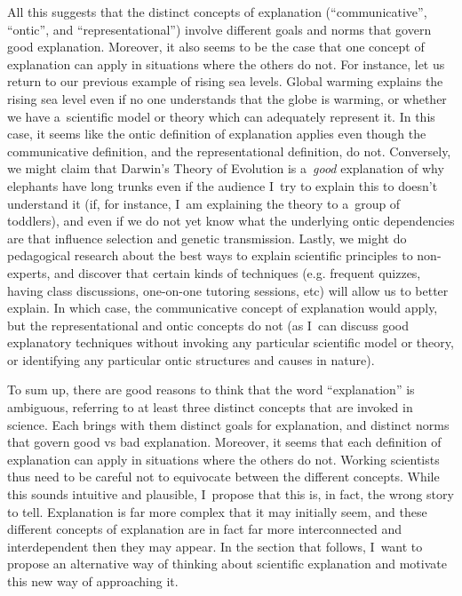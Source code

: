 All this suggests that the distinct concepts of explanation (``communicative'', ``ontic'', and ``representational'') involve different goals and norms that govern good explanation. Moreover, it also seems to be the case that one concept of explanation can apply in situations where the others do not. For instance, let us return to our previous example of rising sea levels. Global warming explains the rising sea level even if no one understands that the globe is warming, or whether we have a~scientific model or theory which can adequately represent it. In this case, it seems like the ontic definition of explanation applies even though the communicative definition, and the representational definition, do not. Conversely, we might claim that Darwin's Theory of Evolution is a~\textit{good} explanation of why elephants have long trunks even if the audience I~try to explain this to doesn't understand it (if, for instance, I~am explaining the theory to a~group of toddlers), and even if we do not yet know what the underlying ontic dependencies are that influence selection and genetic transmission. Lastly, we might do pedagogical research about the best ways to explain scientific principles to non-experts, and discover that certain kinds of techniques (e.g. frequent quizzes, having class discussions, one-on-one tutoring sessions, etc) will allow us to better explain. In which case, the communicative concept of explanation would apply, but the representational and ontic concepts do not (as I~can discuss good explanatory techniques without invoking any particular scientific model or theory, or identifying any particular ontic structures and causes in nature).

To sum up, there are good reasons to think that the word ``explanation'' is ambiguous, referring to at least three distinct concepts that are invoked in science. Each brings with them distinct goals for explanation, and distinct norms that govern good vs bad explanation. Moreover, it seems that each definition of explanation can apply in situations where the others do not. Working scientists thus need to be careful not to equivocate between the different concepts. While this sounds intuitive and plausible, I~propose that this is, in fact, the wrong story to tell. Explanation is far more complex that it may initially seem, and these different concepts of explanation are in fact far more interconnected and interdependent then they may appear. In the section that follows, I~want to propose an alternative way of thinking about scientific explanation and motivate this new way of approaching it.


